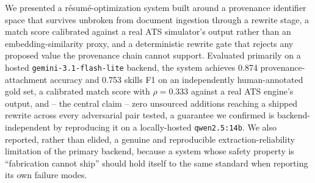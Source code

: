 \documentclass{article}
\begin{document}
We presented a résumé-optimization system built around a provenance identifier space that survives
unbroken from document ingestion through a rewrite stage, a match score calibrated against a real
ATS simulator's output rather than an embedding-similarity proxy, and a deterministic rewrite gate
that rejects any proposed value the provenance chain cannot support. Evaluated primarily on a
hosted \texttt{gemini-3.1-flash-lite} backend, the system achieves 0.874 provenance-attachment
accuracy and 0.753 skills F1 on an independently human-annotated gold set, a calibrated match score
with $\rho=0.333$ against a real ATS engine's output, and -- the central claim -- zero unsourced
additions reaching a shipped rewrite across every adversarial pair tested, a guarantee we confirmed
is backend-independent by reproducing it on a locally-hosted \texttt{qwen2.5:14b}. We also reported,
rather than elided, a genuine and reproducible extraction-reliability limitation of the primary
backend, because a system whose safety property is ``fabrication cannot ship'' should hold itself
to the same standard when reporting its own failure modes.


\end{document}
